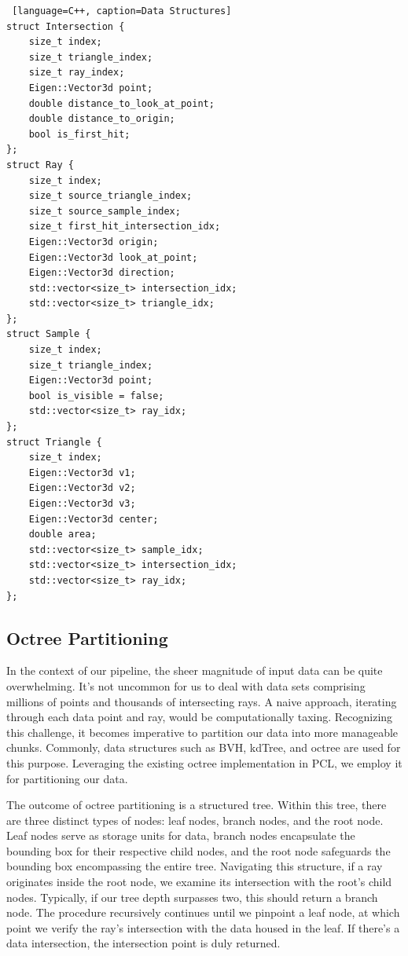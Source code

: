 \documentclass[11pt, a4paper,oneside,chapterprefix=false]{scrbook}
\begin{document}
\begin{lstlisting} [language=C++, caption=Data Structures]
struct Intersection {
    size_t index;
    size_t triangle_index;
    size_t ray_index;
    Eigen::Vector3d point;
    double distance_to_look_at_point;
    double distance_to_origin;
    bool is_first_hit;
};
struct Ray { 
    size_t index;
    size_t source_triangle_index;
    size_t source_sample_index;
    size_t first_hit_intersection_idx;
    Eigen::Vector3d origin;
    Eigen::Vector3d look_at_point;
    Eigen::Vector3d direction;
    std::vector<size_t> intersection_idx;
    std::vector<size_t> triangle_idx;
};
struct Sample {
    size_t index;
    size_t triangle_index;
    Eigen::Vector3d point;
    bool is_visible = false;
    std::vector<size_t> ray_idx;
};
struct Triangle {
    size_t index;
    Eigen::Vector3d v1;
    Eigen::Vector3d v2;
    Eigen::Vector3d v3;
    Eigen::Vector3d center;
    double area;
    std::vector<size_t> sample_idx;
    std::vector<size_t> intersection_idx;
    std::vector<size_t> ray_idx;
};

\end{lstlisting}

\subsection{Octree Partitioning}

In the context of our pipeline, the sheer magnitude of input data can be quite overwhelming. It's not uncommon for us to deal with data sets comprising millions of points and thousands of intersecting rays. A naive approach, iterating through each data point and ray, would be computationally taxing. Recognizing this challenge, it becomes imperative to partition our data into more manageable chunks. Commonly, data structures such as BVH, kdTree, and octree are used for this purpose. Leveraging the existing octree implementation in PCL, we employ it for partitioning our data.

The outcome of octree partitioning is a structured tree. Within this tree, there are three distinct types of nodes: leaf nodes, branch nodes, and the root node. Leaf nodes serve as storage units for data, branch nodes encapsulate the bounding box for their respective child nodes, and the root node safeguards the bounding box encompassing the entire tree. Navigating this structure, if a ray originates inside the root node, we examine its intersection with the root's child nodes. Typically, if our tree depth surpasses two, this should return a branch node. The procedure recursively continues until we pinpoint a leaf node, at which point we verify the ray's intersection with the data housed in the leaf. If there's a data intersection, the intersection point is duly returned.
\end{document}
